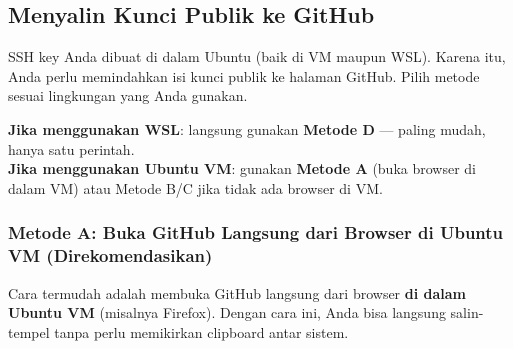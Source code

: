 \documentclass[
    a4paper,
    11pt,
    parskip=half
]{scrartcl}
\begin{document}
\subsection{Menyalin Kunci Publik ke GitHub}
\label{sec:add-to-github}

SSH key Anda dibuat di dalam Ubuntu (baik di VM maupun WSL). Karena itu, Anda perlu memindahkan isi kunci publik ke halaman GitHub. Pilih metode sesuai lingkungan yang Anda gunakan.

\begin{notebox}
\textbf{Jika menggunakan WSL}: langsung gunakan \textbf{Metode D} --- paling mudah, hanya satu perintah.\\
\textbf{Jika menggunakan Ubuntu VM}: gunakan \textbf{Metode A} (buka browser di dalam VM) atau Metode B/C jika tidak ada browser di VM.
\end{notebox}

\subsubsection*{Metode A: Buka GitHub Langsung dari Browser di Ubuntu VM (Direkomendasikan)}

Cara termudah adalah membuka GitHub langsung dari browser \textbf{di dalam Ubuntu VM} (misalnya Firefox). Dengan cara ini, Anda bisa langsung salin-tempel tanpa perlu memikirkan clipboard antar sistem.
\end{document}
